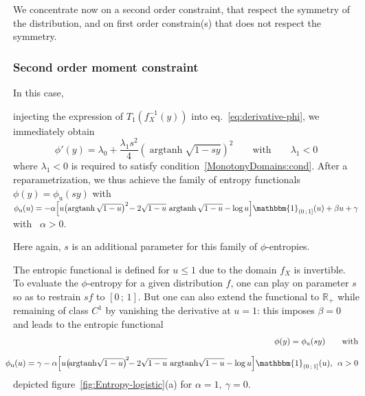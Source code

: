 \documentclass[entropy,article,submit,moreauthors,pdftex]{Definitions/mdpi}
\newcommand{\SZ}[1]{{\color{blue} #1}}                                       %
\def\Rset{\mathbb{R}}%
\def\X{\mathcal{X}}%
\def\un{\mathbbm{1}}%
\def\argtanh{\operatorname{argtanh}}%
\def\u{\mathrm{u}}
\begin{document}
We concentrate  now on a second  order constraint, that respect  the symmetry of
the distribution,  and on  first order  constrain(s) that  does not  respect the
symmetry.


\subsubsection{Second order moment constraint}
\label{subsubsecapp:LogisticSecondOrder}

In this  case, \SZ{injecting the  expression of $T_1\left(  f_X^{-1}(y) \right)$
  into   eq.~\eqref{eq:derivative-phi},   we   immediately   obtain
%
\[
\phi'(y) = \lambda_0 + \frac{\lambda_1 s^2}{4} \left( \argtanh\sqrt{1 - s y} \right)^2
\qquad \mbox{with} \qquad \lambda_1 < 0
\]
%
where      $\lambda_1      <      0$       is      required      to      satisfy
condition~\ref{MonotonyDomains:cond}.
%
After a  reparametrization, we  thus achieve the  family of  entropy functionals
$\phi(y)  =   \phi_\u(s  y)$  with   $\phi_\u(u)  =  -\alpha  \left[   u  \left(
  \argtanh\sqrt{1-u} \right)^2 \!  - 2 \sqrt{1-u} \, \argtanh\sqrt{1-u} - \log u
  \right] \un_{\left( 0 \, ; \, 1 \right]}(u) + \beta u + \gamma$ with \ $\alpha
> 0$.

Here again, $s$ is an additional parameter for this family of $\phi$-entropies.

The entropic  functional is defined  for $u  \le 1$ due  to the domain  $f_X$ is
invertible. To evaluate the $\phi$-entropy for a given distribution $f$, one can
play on parameter  $s$ so as to restrain $s  f$ to $[0 \, ; \,  1]$. But one can
also  extend the  functional  to $\Rset_+$  while remaining  of  class $C^1$  by
vanishing the derivative at  $u = 1$: this imposes $\beta = 0$  and leads to the
entropic functional
%
\begin{eqnarray*}
  &&\hspace{-7mm}\phi(y) = \phi_\u(s y) \qquad \mbox{with}
 \\[2.5mm]  
&&\hspace{-7mm}\phi_\u(u)  =  \gamma - \alpha \left[  u  \left( \! \argtanh\!\sqrt{1-u} \right)^{\! 2} \!\!  -  2
  \sqrt{1-u}  \, \argtanh\!\sqrt{1-u} -  \log  u  \right] \un_{\left(  0  \,  ; \,  1
  \right]}(u), \:\: \alpha > 0
\end{eqnarray*}
%
depicted figure~\ref{fig:Entropy-logistic}(a) for $\alpha = 1, \: \gamma = 0$.
}
\end{document}
